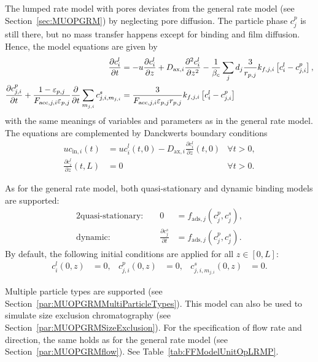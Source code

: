 The lumped rate model with pores  \cite{Guiochon2006,Felinger2004} deviates from the general rate model (see Section~\ref{sec:MUOPGRM}) by neglecting pore diffusion.
The particle phase $c^p_j$ is still there, but no mass transfer happens except for binding and film diffusion.
Hence, the model equations are given by
\begin{align}
	\frac{\partial c^l_i}{\partial t} &= -u \frac{\partial c^l_i}{\partial z} + D_{\text{ax},i} \frac{\partial^2 c^l_i}{\partial z^2} - \frac{1}{\beta_c} \sum_{j} d_j \frac{3}{r_{p,j}} k_{f,j,i}\left[ c^l_i - c^p_{j,i} \right], \\
	\frac{\mathop{}\!\mathrm{\partial} c^p_{j,i}}{\mathop{}\!\mathrm{\partial} t} + \frac{1 - \varepsilon_{p,j}}{F_{\text{acc},j,i} \varepsilon_{p,j}} \frac{\mathop{}\!\mathrm{\partial}}{\mathop{}\!\mathrm{\partial} t} \sum_{m_{j,i}} c^s_{j,i,m_{j,i}} &= \frac{3}{F_{\text{acc},j,i} \varepsilon_{p,j} r_{p,j}}k_{f,j,i}\left[ c^l_i - c^p_{j,i} \right]
\end{align}
with the same meanings of variables and parameters as in the general rate model. 
The equations are complemented by Danckwerts boundary conditions \cite{Danckwerts1953}
\begin{align*}
	u c_{\text{in},i}(t) &= u c^l_i(t,0) - D_{\text{ax},i} \frac{\partial c^l_i}{\partial z}(t, 0) & \forall t > 0,\\
	\frac{\partial c^l_i}{\partial z}(t, L) &= 0 & \forall t > 0.
\end{align*}

As for the general rate model, both quasi-stationary and dynamic binding models are supported:
\begin{alignat*}{2}
	\text{quasi-stationary: }& & 0 &= f_{\text{ads},j}\left( c^p_j, c^s_j\right), \\
	\text{dynamic: }& & \frac{\partial c^s_j}{\partial t} &= f_{\text{ads},j}\left( c^p_j, c^s_j\right).
\end{alignat*}
By default, the following initial conditions are applied for all $z \in [0,L]$:
\begin{align}
	c^l_i(0, z) &= 0, & c^p_{j,i}(0, z) &= 0, & c^s_{j,i,m_{j,i}}(0,z) &= 0.
\end{align}

Multiple particle types are supported (see Section~\ref{par:MUOPGRMMultiParticleTypes}).
This model can also be used to simulate size exclusion chromatography (see Section~\ref{par:MUOPGRMSizeExclusion}).
For the specification of flow rate and direction, the same holds as for the general rate model (see Section~\ref{par:MUOPGRMflow}).
See Table~\ref{tab:FFModelUnitOpLRMP}.

